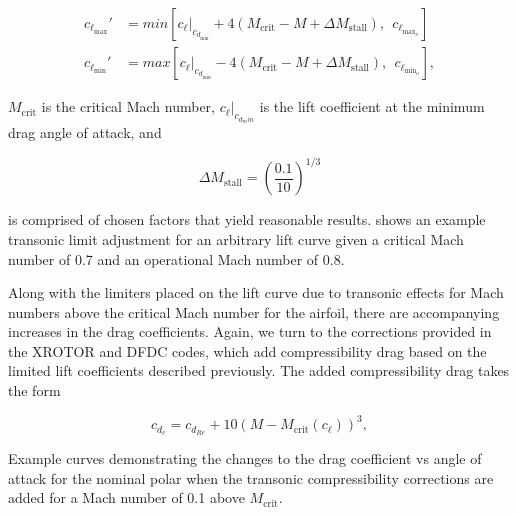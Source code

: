 \begin{subequations}
    \begin{align}
        c_{\ell_\text{max}}' &= min \left[\left.c_\ell\right|_{c_{d_\text{min}}}+4\left(M_\text{crit} - M +\Delta M_\text{stall}\right),~~c_{\ell_{\text{max}_o}}\right] \\
        c_{\ell_\text{min}}' &= max \left[\left.c_\ell\right|_{c_{d_\text{min}}}-4\left(M_\text{crit} - M +\Delta M_\text{stall}\right),~~c_{\ell_{\text{min}_o}} \right],
    \end{align}
\end{subequations}

\where \(M_\text{crit}\) is the critical Mach number, \(\left.c_\ell\right|_{c_{d_min}}\) is the lift coefficient at the minimum drag angle of attack, and

\begin{equation}
    \Delta M_\text{stall} = \left(\frac{0.1}{10}\right)^{1/3}
\end{equation}

\noindent is comprised of chosen factors that yield reasonable results.
%
 shows an example transonic limit adjustment for an arbitrary lift curve given a critical Mach number of 0.7 and an operational Mach number of 0.8.




Along with the limiters placed on the lift curve due to transonic effects for Mach numbers above the critical Mach number for the airfoil, there are accompanying increases in the drag coefficients.
%
Again, we turn to the corrections provided in the XROTOR and DFDC codes, which add compressibility drag based on the limited lift coefficients described previously.
%
The added compressibility drag takes the form

\begin{equation}
    c_{d_c} = c_{d_{Re}} + 10 \left(M-M_\text{crit}(c_\ell)\right)^{3},
\end{equation}

\begin{marginfigure}
	
    \caption{Example curves demonstrating the changes to the drag coefficient vs angle of attack for the nominal polar when the transonic compressibility corrections are added for a Mach number of 0.1 above \(M_\text{crit}\).}
	\label{fig:transdrag-correction}
\end{marginfigure}
%

